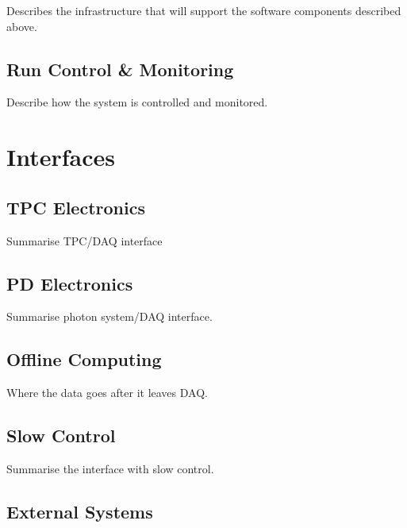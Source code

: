 Describes the infrastructure that will support the software components described above.

\subsection{Run Control \& Monitoring}
\label{sec:fdsp-daq-tcm}

Describe how the system is controlled and monitored.


\section{Interfaces}
\label{sec:fdsp-daq-intfc}


\subsection{TPC Electronics}
\label{sec:fdsp-daq-intfc-elec}

Summarise TPC/DAQ interface

\subsection{PD Electronics}
\label{sec:fdsp-daq-intfc-photon}

Summarise photon system/DAQ interface.

\subsection{Offline Computing}
\label{sec:fdsp-daq-intfc-fnal-cmptg}

Where the data goes after it leaves DAQ.

\subsection{Slow Control}
\label{sec:fdsp-daq-intfc-ext}

Summarise the interface with slow control.


\subsection{External Systems}
\label{sec:fdsp-daq-intfc-ext}

